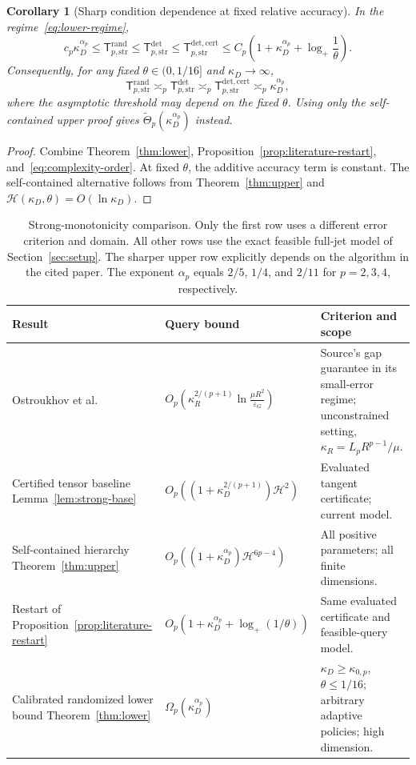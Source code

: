 \documentclass[11pt]{article}
\numberwithin{equation}{section}
\newtheorem{corollary}[theorem]{Corollary}
\theoremstyle{definition}
\theoremstyle{remark}
\newcommand{\Tdet}{\mathsf T_{p,\mathrm{str}}^{\mathrm{det}}}
\newcommand{\Trand}{\mathsf T_{p,\mathrm{str}}^{\mathrm{rand}}}
\newcommand{\Tcert}{\mathsf T_{p,\mathrm{str}}^{\mathrm{det,cert}}}
\newcommand{\ap}{\alpha_p}
\newcommand{\logplus}{\log_{+}}
\begin{document}
\begin{corollary}[Sharp condition dependence at fixed relative accuracy]
\label{cor:frontier}
In the regime~\eqref{eq:lower-regime},
\begin{equation}\label{eq:combined-frontier}
c_p\kappa_D^{\ap}
\le\Trand\le\Tdet\le\Tcert
\le C_p\left(1+\kappa_D^{\ap}+\logplus\frac1\theta\right).
\end{equation}
Consequently, for any fixed $\theta\in(0,1/16]$ and
$\kappa_D\to\infty$,
\[
\Trand\asymp_p\Tdet\asymp_p\Tcert\asymp_p\kappa_D^{\ap},
\]
where the asymptotic threshold may depend on the fixed $\theta$.
Using only the self-contained upper proof gives
$\widetilde\Theta_p(\kappa_D^{\ap})$ instead.
\end{corollary}
\begin{proof}
Combine Theorem~\ref{thm:lower}, Proposition~\ref{prop:literature-restart},
and~\eqref{eq:complexity-order}. At fixed $\theta$, the additive accuracy term is
constant. The self-contained alternative follows from
Theorem~\ref{thm:upper} and
$\mathcal H(\kappa_D,\theta)=O(\ln\kappa_D)$.
\end{proof}

\begin{table}[t]
\centering\small
\setlength{\tabcolsep}{4pt}
\renewcommand{\arraystretch}{1.18}
\begin{tabularx}{\textwidth}{@{}L{0.25\textwidth}L{0.34\textwidth}Y@{}}
\toprule
Result & Query bound & Criterion and scope\\
\midrule
Ostroukhov et al.\ \cite{ostroukhov2020}
& $O_p\!\left(\kappa_R^{2/(p+1)}
\ln\frac{\mu R^2}{\varepsilon_G}\right)$
& Source's gap guarantee in its small-error regime; unconstrained setting,
$\kappa_R=L_pR^{p-1}/\mu$.\\
Certified tensor baseline\newline
Lemma~\ref{lem:strong-base}
& $O_p((1+\kappa_D^{2/(p+1)})\mathcal H^2)$
& Evaluated tangent certificate; current model.\\
Self-contained hierarchy\newline
Theorem~\ref{thm:upper}
& $O_p((1+\kappa_D^{\ap})\mathcal H^{6p-4})$
& All positive parameters; all finite dimensions.\\
Restart of\ \cite{zhangchen2026}\newline
Proposition~\ref{prop:literature-restart}
& $O_p(1+\kappa_D^{\ap}+\logplus(1/\theta))$
& Same evaluated certificate and feasible-query model.\\
Calibrated randomized lower bound\newline
Theorem~\ref{thm:lower}
& $\Omega_p(\kappa_D^{\ap})$
& $\kappa_D\ge\kappa_{0,p}$, $\theta\le1/16$;
arbitrary adaptive policies; high dimension.\\
\bottomrule
\end{tabularx}
\caption{Strong-monotonicity comparison. Only the first row uses a
different error criterion and domain. All other rows use
the exact feasible full-jet model of Section~\ref{sec:setup}.
The sharper upper row explicitly depends on the algorithm in the cited
paper. The exponent $\ap$ equals $2/5$, $1/4$, and $2/11$ for
$p=2,3,4$, respectively.}
\label{tab:comparison}
\end{table}
\end{document}
